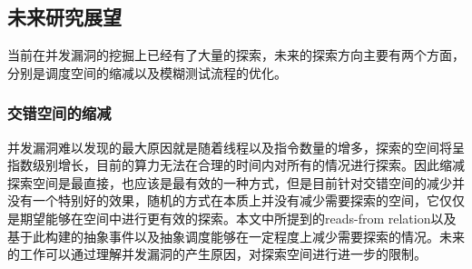 


\subsection{未来研究展望}

当前在并发漏洞的挖掘上已经有了大量的探索，未来的探索方向主要有两个方面，分别是调度空间的缩减以及模糊测试流程的优化。

\subsubsection{交错空间的缩减}

并发漏洞难以发现的最大原因就是随着线程以及指令数量的增多，探索的空间将呈指数级别增长，目前的算力无法在合理的时间内对所有的情况进行探索。因此缩减探索空间是最直接，也应该是最有效的一种方式，但是目前针对交错空间的减少并没有一个特别好的效果，随机的方式在本质上并没有减少需要探索的空间，它仅仅是期望能够在空间中进行更有效的探索。本文中所提到的reads-from relation以及基于此构建的抽象事件以及抽象调度能够在一定程度上减少需要探索的情况。未来的工作可以通过理解并发漏洞的产生原因，对探索空间进行进一步的限制。

